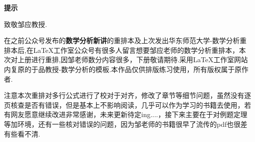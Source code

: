 \newpage

\begin{center}
	\textbf{\heiti \large 提示}
\end{center}

致敬邹应教授.

在之前公众号发布的\textbf{数学分析新讲}的重排本及上次发出华东师范大学-数学分析重排本后,在\LaTeX 工作室公众号有很多人留言想要邹应老师的数学分析重排本，本次对上册进行重排,因邹老师数分内容很多，下册敬请期待.采用\LaTeX 工作室网站内复原的于品教授-数学分析的模板.本作品仅供排版练习使用，所有版权属于原作者.

{\heiti 注意本次重排对多行公式进行了校对于对齐，修改了章节等细节问题，虽然没有逐页核查是否有错误，但是基本上不影响阅读，几乎可以作为学习的书籍去使用，若有网友愿意继续改进非常感谢，未来更新待定ing....，接下来主要在于对例题定理等加环境，还有一些核对错误的问题，因为邹老师的书籍很早了流传的pdf也很差有些看不清.}



\newpage